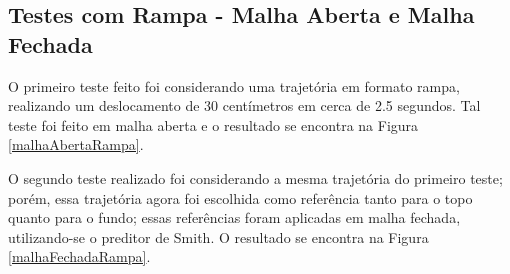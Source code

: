 \subsection{Testes com Rampa - Malha Aberta e Malha Fechada}
O primeiro teste feito foi considerando uma trajetória em formato rampa, realizando um deslocamento de 30 centímetros em cerca de 2.5 segundos. Tal teste foi feito em malha aberta e o resultado se encontra na Figura \ref{malhaAbertaRampa}. 

O segundo teste realizado foi considerando a mesma trajetória do primeiro teste; porém, essa trajetória agora foi escolhida como referência tanto para o topo quanto para o fundo; essas referências foram aplicadas em malha fechada, utilizando-se o preditor de Smith. O resultado se encontra na Figura \ref{malhaFechadaRampa}.


